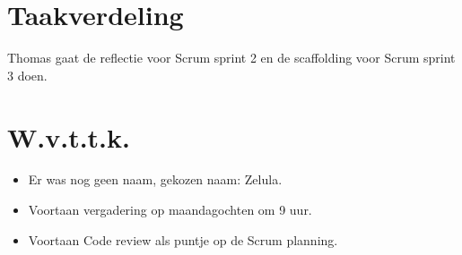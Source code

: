 \documentclass{article}
\begin{document}
\section{Taakverdeling}
Thomas gaat de reflectie voor Scrum sprint 2 en de scaffolding voor Scrum sprint 3 doen.

\section{W.v.t.t.k.}
\begin{itemize}
\item Er was nog geen naam, gekozen naam: Zelula.
\item Voortaan vergadering op maandagochten om 9 uur.
\item Voortaan Code review als puntje op de Scrum planning.
\end{itemize}
\end{document}
